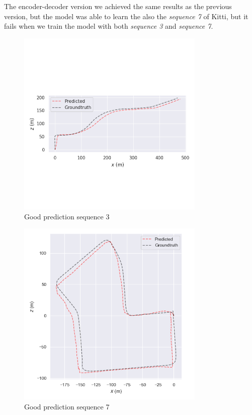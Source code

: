 The encoder-decoder version we achieved the same results as the previous version, but the model was able to learn the also the \textit{sequence 7} of Kitti, but it fails when we train the model with both \textit{sequence 3} and \textit{sequence 7}.
\begin{figure}[H]
    \centering
    \includegraphics[width=0.8\textwidth]{images/1_4_well_predicted_seq_3}
    \caption{Good prediction sequence 3}\label{fig:well-predicted-seq-3}
\end{figure}
\begin{figure}[H]
    \centering
    \includegraphics[width=0.8\textwidth]{images/1_4_well_predicted_seq_7}
    \caption{Good prediction sequence 7}\label{fig:well-predicted-seq-7}
\end{figure}

